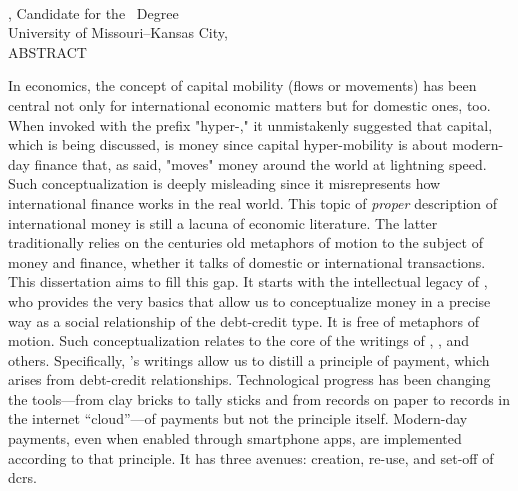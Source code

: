 %
%
\begin{center}
\vspace*{0.01in}
\large{\MakeUppercase{\MyThesisTitle}}\\
\vspace{24pt}

\normalsize{
  \MyName, Candidate for the \MyDegree\ Degree\\
  University of Missouri--Kansas City, \MyDegreeAwardYear\\
  \vspace{24pt}
  \MakeUppercase{Abstract}
  \vspace{12pt}
}

\end{center}

\doublespacing

In economics, the concept of capital mobility (flows or movements) has been central not only for international economic matters but for domestic ones, too.  When invoked with the prefix "hyper-," it unmistakenly suggested that capital, which is being discussed, is money since capital hyper-mobility is about modern-day finance that, as said, "moves" money around the world at lightning speed.  Such conceptualization is deeply misleading since it misrepresents how international finance works in the real world.   This topic of \textit{proper} description of international money is still a lacuna of economic literature. The latter traditionally relies on the centuries old metaphors of motion to the subject of money and finance, whether it talks of domestic or international transactions.  This dissertation aims to fill this gap.  It starts with the intellectual legacy of \citeauthor{innes1913}, who provides the very basics that allow us to conceptualize money in a precise way as a social relationship of the debt-credit type.  It is free of metaphors of motion.  Such conceptualization relates to the core of the writings of \citeauthor{commons1951}, \citeauthor{keynes1936}, \citeauthor{minsky1986} and others. Specifically, \citeauthor{innes1913}'s writings allow us to distill a principle of payment, which arises from debt-credit relationships.  Technological progress has been changing the tools---from clay bricks to tally sticks and from records on paper to records in the internet ``cloud''---of payments but not the principle itself.  Modern-day payments, even when enabled through smartphone apps, are implemented according to that principle. It has three avenues: creation, re-use, and set-off of \acfp{dcr}. 

